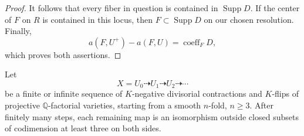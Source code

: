 \begin{proof}
It follows that every fiber in question is contained in
$\operatorname{Supp}D$.  If the center of $F$ on $R$ is contained
in this locus, then $F\subset\operatorname{Supp}D$ on our chosen
resolution.  Finally,
\[
 a(F,U^+)-a(F,U)=\operatorname{coeff}_F D,
\]
which proves both assertions.
\end{proof}

\begin{lemma}\label{mmp:stabilization}
Let
\[
 X=U_0\dashrightarrow U_1\dashrightarrow U_2\dashrightarrow\cdots
\]
be a finite or infinite sequence of $K$-negative divisorial
contractions and $K$-flips of projective $\mathbb Q$-factorial
varieties, starting from a smooth $n$-fold, $n\geq 3$.
After finitely many steps, each remaining map is an isomorphism
outside closed subsets of codimension at least three on both sides.
\end{lemma}

